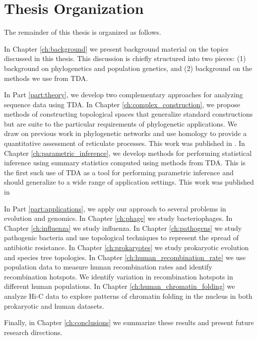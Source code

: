 

\section{Thesis Organization}

The remainder of this thesis is organized as follows.

In Chapter \ref{ch:background} we present background material on the topics discussed in this thesis.
This discussion is chiefly structured into two pieces: (1) background on phylogenetics and population genetics, and (2) background on the methods we use from TDA.

In Part \ref{part:theory}, we develop two complementary approaches for analyzing sequence data using TDA.
In Chapter \ref{ch:complex_construction}, we propose methods of constructing topological spaces that generalize standard constructions but are suite to the particular requirements of phylogenetic applications.
We draw on previous work in phylogenetic networks and use homology to provide a quantitative assessment of reticulate processes.
This work was published in \cite{Emmett:2015a}.
In Chapter \ref{ch:parametric_inference}, we develop methods for performing statistical inference using summary statistics computed using methods from TDA.
This is the first such use of TDA as a tool for performing parametric inference and should generalize to a wide range of application settings.
This work was published in \cite{Emmett:2014b}

In Part \ref{part:applications}, we apply our approach to several problems in evolution and genomics.
In Chapter \ref{ch:phage} we study bacteriophages.
In Chapter \ref{ch:influenza} we study influenza.
In Chapter \ref{ch:pathogens} we study pathogenic bacteria and use topological techniques to represent the spread of antibiotic resistance.
In Chapter \ref{ch:prokaryotes} we study prokaryotic evolution and species tree topologies.
In Chapter \ref{ch:human_recombination_rate} we use population data to measure human recombination rates and identify recombination hotspots.
We identify variation in recombination hotspots in different human populations.
In Chapter \ref{ch:human_chromatin_folding} we analyze Hi-C data to explore patterns of chromatin folding in the nucleus in both prokaryotic and human datasets.

Finally, in Chapter \ref{ch:conclusions} we summarize these results and present future research directions.